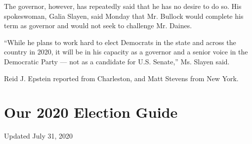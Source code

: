 The governor, however, has repeatedly said that he has no desire to do
so. His spokeswoman, Galia Slayen, said Monday that Mr. Bullock would
complete his term as governor and would not seek to challenge Mr.
Daines.

``While he plans to work hard to elect Democrats in the state and across
the country in 2020, it will be in his capacity as a governor and a
senior voice in the Democratic Party --- not as a candidate for U.S.
Senate,'' Ms. Slayen said.

Reid J. Epstein reported from Charleston, and Matt Stevens from New
York.

\hypertarget{our-2020-election-guide}{%
\section{Our 2020 Election Guide}\label{our-2020-election-guide}}

Updated July 31, 2020

